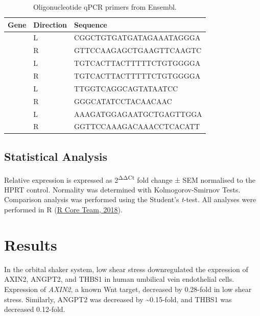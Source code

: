 \documentclass[
  12pt,
]{article}
\begin{document}
\begin{table}[!h]

\caption{\label{tab:primers}Oligonucleotide qPCR primers from Ensembl.}
\begin{tabu} to 
\toprule
Gene & Direction & Sequence\\
\midrule
 & L & CGGCTGTGATGATAGAAATAGGGA\\

 & R & GTTCCAAGAGCTGAAGTTCAAGTC\\

 & L & TGTCACTTACTTTTTCTGTGGGGA\\

 & R & TGTCACTTACTTTTTCTGTGGGGA\\

 & L & TTGGTCAGGCAGTATAATCC\\

 & R & GGGCATATCCTACAACAAC\\

 & L & AAAGATGGAGAATGCTGAGTTGGA\\

 & R & GGTTCCAAAGACAAACCTCACATT\\
\bottomrule
\end{tabu}
\end{table}

\hypertarget{statistical-analysis}{%
\subsection{Statistical Analysis}\label{statistical-analysis}}

Relative expression is expressed as 2\textsuperscript{ΔΔCt} fold change ± SEM normalised to the HPRT control. Normality was determined with Kolmogorov-Smirnov Tests. Comparison analysis was performed using the Student's \emph{t}-test. All analyses were performed in R (\protect\hyperlink{ref-R}{R Core Team, 2018}).

\hypertarget{results}{%
\section{Results}\label{results}}

In the orbital shaker system, low shear stress downregulated the expression of AXIN2, ANGPT2, and THBS1 in human umbilical vein endothelial cells. Expression of \emph{AXIN2}, a known Wnt target, decreased by 0.28-fold in low shear stress. Similarly, ANGPT2 was decreased by \textasciitilde0.15-fold, and THBS1 was decreased 0.12-fold.
\end{document}
